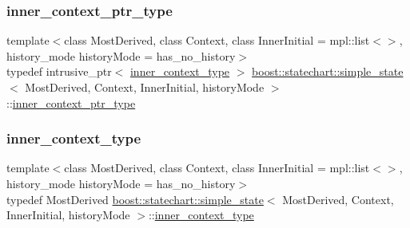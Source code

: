 \subsubsection{\texorpdfstring{inner\+\_\+context\+\_\+ptr\+\_\+type}{inner\_context\_ptr\_type}}
{\footnotesize\ttfamily template$<$class Most\+Derived, class Context, class Inner\+Initial = mpl\+::list$<$$>$, history\+\_\+mode history\+Mode = has\+\_\+no\+\_\+history$>$ \\
typedef intrusive\+\_\+ptr$<$ \mbox{\hyperlink{classboost_1_1statechart_1_1simple__state_a2474f5eb168d48615fa1db224653457a}{inner\+\_\+context\+\_\+type}} $>$ \mbox{\hyperlink{classboost_1_1statechart_1_1simple__state}{boost\+::statechart\+::simple\+\_\+state}}$<$ Most\+Derived, Context, Inner\+Initial, history\+Mode $>$\+::\mbox{\hyperlink{classboost_1_1statechart_1_1simple__state_ad6d3233a11a23e91b4cc9edcae799379}{inner\+\_\+context\+\_\+ptr\+\_\+type}}}

\mbox{\label{classboost_1_1statechart_1_1simple__state_a2474f5eb168d48615fa1db224653457a}} 
\subsubsection{\texorpdfstring{inner\+\_\+context\+\_\+type}{inner\_context\_type}}
{\footnotesize\ttfamily template$<$class Most\+Derived, class Context, class Inner\+Initial = mpl\+::list$<$$>$, history\+\_\+mode history\+Mode = has\+\_\+no\+\_\+history$>$ \\
typedef Most\+Derived \mbox{\hyperlink{classboost_1_1statechart_1_1simple__state}{boost\+::statechart\+::simple\+\_\+state}}$<$ Most\+Derived, Context, Inner\+Initial, history\+Mode $>$\+::\mbox{\hyperlink{classboost_1_1statechart_1_1simple__state_a2474f5eb168d48615fa1db224653457a}{inner\+\_\+context\+\_\+type}}}

\mbox{\label{classboost_1_1statechart_1_1simple__state_ae86cab19f07d10cd8e46937fd243d4ba}} 
